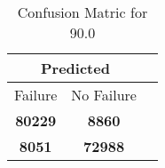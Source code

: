 \begin{table}[] 
\caption{Confusion Matric for 90.0} 
\label{Table: Prediction Accuracy-DMD90.0OnlySunEKF-ignoreReflection10.9EKF-top2-Reflection} 
\centering 
\begin{tabular} 
 {@{}ccc@{}} 
\toprule 
\multicolumn{2}{c}{\textbf{Predicted}}
 \\ \midrule 
\multicolumn{1}{|c|}{Failure} & 
\multicolumn{1}{c|}{No Failure}
 \\ \midrule 
\multicolumn{1}{|c|}{\color{green}\textbf{80229}} & 
\multicolumn{1}{c|}{\color{red}\textbf{8860}}
 \\ \midrule 
\multicolumn{1}{|c|}{\color{red}\textbf{8051}} & 
\multicolumn{1}{c|}{\color{green}\textbf{72988}}
 \\ \bottomrule 
\end{tabular} 
\end{table} 

